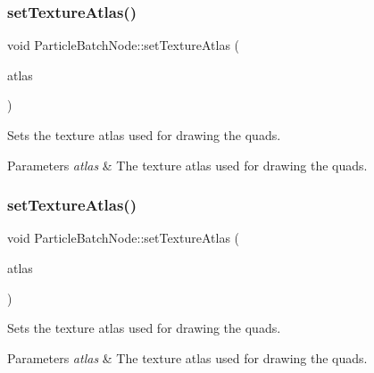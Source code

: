 \subsubsection{\texorpdfstring{set\+Texture\+Atlas()}{setTextureAtlas()}\hspace{0.1cm}{\footnotesize\ttfamily [1/2]}}
{\footnotesize\ttfamily void Particle\+Batch\+Node\+::set\+Texture\+Atlas (\begin{DoxyParamCaption}\item[{\hyperlink{classTextureAtlas}{Texture\+Atlas} $\ast$}]{atlas }\end{DoxyParamCaption})\hspace{0.3cm}{\ttfamily [inline]}}

Sets the texture atlas used for drawing the quads.


\begin{DoxyParams}{Parameters}
{\em atlas} & The texture atlas used for drawing the quads. \\
\hline
\end{DoxyParams}
\mbox{\label{classParticleBatchNode_a67fa60ccb7be07438228ea461682a483}} 
\subsubsection{\texorpdfstring{set\+Texture\+Atlas()}{setTextureAtlas()}\hspace{0.1cm}{\footnotesize\ttfamily [2/2]}}
{\footnotesize\ttfamily void Particle\+Batch\+Node\+::set\+Texture\+Atlas (\begin{DoxyParamCaption}\item[{\hyperlink{classTextureAtlas}{Texture\+Atlas} $\ast$}]{atlas }\end{DoxyParamCaption})\hspace{0.3cm}{\ttfamily [inline]}}

Sets the texture atlas used for drawing the quads.


\begin{DoxyParams}{Parameters}
{\em atlas} & The texture atlas used for drawing the quads. \\
\hline
\end{DoxyParams}
\mbox{\label{classParticleBatchNode_ad11baa30bf900df09491dd652d16b954}} 
